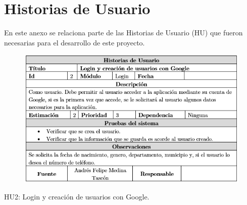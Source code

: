 \documentclass[12pt,letterpaper,openany]{book}
\begin{document}

\appendix
\chapter{Historias de Usuario}\label{aped.A}
En este anexo se relaciona parte de las Historias de Usuario (HU) que fueron necesarias para el desarrollo de este proyecto.	
\begin{table}[H]
\begin{center}
\begin{figure}[H]
\begin{center}
\includegraphics[width=13cm]{./imagenes/HU/HU2}
\end{center}
\end{figure}
\end{center}
\caption{HU2: Login y creación de usuarios con Google.}
\end{table}
\end{document}

